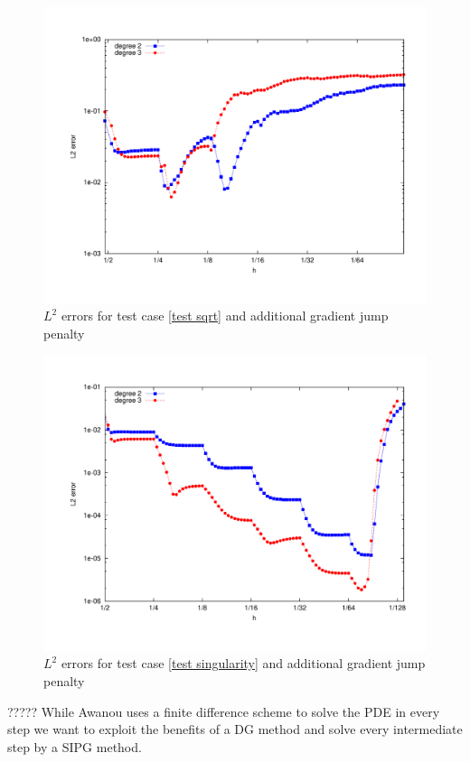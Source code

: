 \begin{figure}[h!]
	\includegraphics[scale =0.5]{plots/MA3.pdf}
	\caption{$L^2$ errors for test case \ref{test sqrt} and additional gradient jump penalty}
	\label{fig: l2 errors test sqrt ourMethod}
\end{figure}


\begin{figure}[h!]
	\includegraphics[scale =0.5]{plots/MA2.pdf}
	\caption{$L^2$ errors for test case \ref{test singularity} and additional gradient jump penalty}
	\label{fig: l2 errors test singularity ourMethod}
\end{figure}



?????
While Awanou uses a finite difference scheme to solve the PDE in every step we want to exploit the benefits of a DG method and solve every intermediate step by a SIPG method. 
